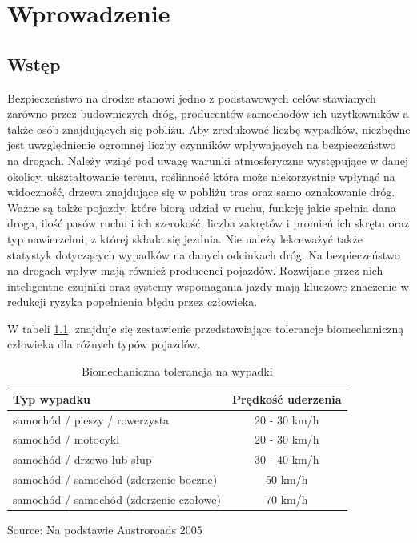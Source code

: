 \chapter{Wprowadzenie}
\label{cha:wprowadzenie}


\section{Wstęp}
\label{sec:wstep}

Bezpieczeństwo na drodze stanowi jedno z podstawowych celów stawianych zarówno przez budowniczych dróg, producentów samochodów ich użytkowników a także osób znajdujących się pobliżu. Aby zredukować liczbę wypadków, niezbędne jest uwzględnienie ogromnej liczby czynników wpływających na bezpieczeństwo na drogach. Należy wziąć pod uwagę warunki atmosferyczne występujące w danej okolicy, ukształtowanie terenu, roślinność która może niekorzystnie wpłynąć na widoczność, drzewa znajdujące się w pobliżu tras oraz samo oznakowanie dróg. Ważne są także pojazdy, które biorą udział w ruchu, funkcję jakie spełnia dana droga, ilość pasów ruchu i ich szerokość, liczba zakrętów i promień ich skrętu oraz typ nawierzchni, z której składa się jezdnia. Nie należy lekceważyć także statystyk dotyczących wypadków na danych odcinkach dróg. Na bezpieczeństwo na drogach wpływ mają również producenci pojazdów. Rozwijane przez nich inteligentne czujniki oraz systemy wspomagania jazdy mają kluczowe znaczenie w redukcji ryzyka popełnienia błędu przez człowieka.

W tabeli \ref{BiomechanicznaToleracja}. znajduje się zestawienie przedstawiające tolerancje biomechaniczną człowieka dla różnych typów pojazdów.

\newcommand{\source}[1]{\caption*{Source: {#1}} }

\begin{table}[ht]
\centering
\caption{Biomechaniczna tolerancja na wypadki}
\label{BiomechanicznaToleracja}
\begin{tabular}{| l | c |}
\hline
\textbf{Typ wypadku}                    & \textbf{Prędkość uderzenia} \\ \hline
samochód / pieszy / rowerzysta          & 20 - 30 km/h                                    \\ \hline
samochód / motocykl                     & 20 - 30 km/h                                    \\ \hline
samochód / drzewo lub słup              & 30 - 40 km/h                                    \\ \hline
samochód / samochód (zderzenie boczne)  & 50 km/h                                         \\ \hline
samochód / samochód (zderzenie czołowe) & 70 km/h   \\ \hline
\end{tabular}
\source{Na podstawie Austroroads 2005}
\end{table}

